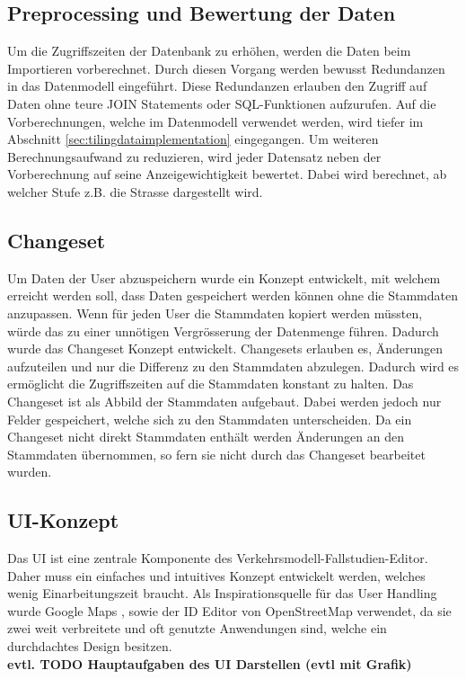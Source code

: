 \subsection{Preprocessing und Bewertung der Daten}\label{sec:concept_preprocessing}
Um die Zugriffszeiten der Datenbank zu erhöhen, werden die Daten beim Importieren vorberechnet. Durch diesen Vorgang werden bewusst Redundanzen in das Datenmodell eingeführt. Diese Redundanzen erlauben den Zugriff auf Daten ohne teure JOIN Statements oder SQL-Funktionen aufzurufen. Auf die Vorberechnungen, welche im Datenmodell verwendet werden, wird tiefer im Abschnitt \ref{sec:tilingdataimplementation}  eingegangen. Um weiteren Berechnungsaufwand zu reduzieren, wird jeder Datensatz neben der Vorberechnung auf seine Anzeigewichtigkeit bewertet. Dabei wird berechnet, ab welcher Stufe z.B. die Strasse dargestellt wird.

\subsection{Changeset}
Um Daten der User abzuspeichern wurde ein Konzept entwickelt, mit welchem erreicht werden soll, dass Daten gespeichert werden können ohne die Stammdaten anzupassen. Wenn für jeden User die Stammdaten kopiert werden müssten, würde das zu einer unnötigen Vergrösserung der Datenmenge führen. Dadurch wurde das Changeset Konzept entwickelt. Changesets erlauben es, Änderungen aufzuteilen und nur die Differenz zu den Stammdaten abzulegen. Dadurch wird es ermöglicht die Zugriffszeiten auf die Stammdaten konstant zu halten. Das Changeset ist als Abbild der Stammdaten aufgebaut. Dabei werden jedoch nur Felder gespeichert, welche sich zu den Stammdaten unterscheiden. Da ein Changeset nicht direkt Stammdaten enthält werden Änderungen an den Stammdaten übernommen, so fern sie nicht durch das Changeset bearbeitet wurden.
\subsection{UI-Konzept}
Das UI ist eine zentrale Komponente des Verkehrsmodell-Fallstudien-Editor. Daher muss ein einfaches und intuitives Konzept entwickelt werden, welches wenig Einarbeitungszeit braucht. Als Inspirationsquelle für das User Handling wurde Google Maps \cite{GoogleMaps}, sowie der ID Editor \citep{IDEditor} von OpenStreetMap verwendet, da sie zwei weit verbreitete und oft genutzte Anwendungen sind, welche ein durchdachtes Design besitzen.\\[0.8cm]
\textbf{evtl. TODO Hauptaufgaben des UI Darstellen (evtl mit Grafik)}
\newpage
